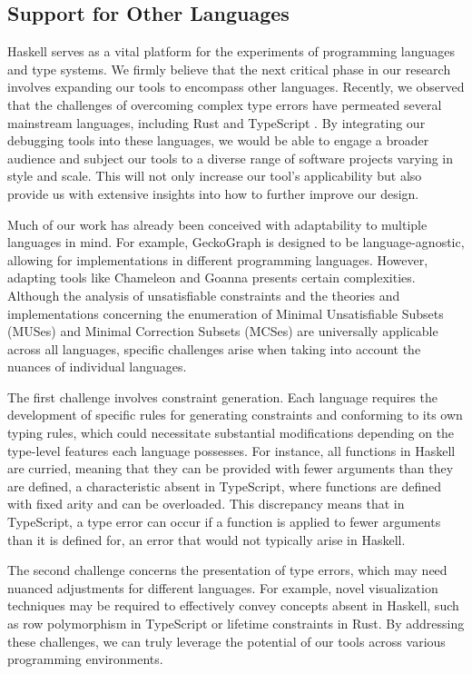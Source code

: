 \subsection{Support for Other Languages}
Haskell serves as a vital platform for the experiments of programming languages and type systems. We firmly believe that the next critical phase in our research involves expanding our tools to encompass other languages. Recently, we observed that the challenges of overcoming complex type errors have permeated several mainstream languages, including Rust \cite{Zeng2019-ou} and TypeScript \cite{Scarsbrook2023-uq}. By integrating our debugging tools into these languages, we would be able to engage a broader audience and subject our tools to a diverse range of software projects varying in style and scale. This will not only increase our tool's applicability but also provide us with extensive insights into how to further improve our design.

Much of our work has already been conceived with adaptability to multiple languages in mind. For example, GeckoGraph is designed to be language-agnostic, allowing for implementations in different programming languages. However, adapting tools like Chameleon and Goanna presents certain complexities. Although the analysis of unsatisfiable constraints and the theories and implementations concerning the enumeration of Minimal Unsatisfiable Subsets (MUSes) and Minimal Correction Subsets (MCSes) are universally applicable across all languages, specific challenges arise when taking into account the nuances of individual languages.

The first challenge involves constraint generation. Each language requires the development of specific rules for generating constraints and conforming to its own typing rules, which could necessitate substantial modifications depending on the type-level features each language possesses. For instance, all functions in Haskell are curried, meaning that they can be provided with fewer arguments than they are defined, a characteristic absent in TypeScript, where functions are defined with fixed arity and can be overloaded. This discrepancy means that in TypeScript, a type error can occur if a function is applied to fewer arguments than it is defined for, an error that would not typically arise in Haskell.

The second challenge concerns the presentation of type errors, which may need nuanced adjustments for different languages. For example, novel visualization techniques may be required to effectively convey concepts absent in Haskell, such as row polymorphism in TypeScript or lifetime constraints in Rust. By addressing these challenges, we can truly leverage the potential of our tools across various programming environments.

